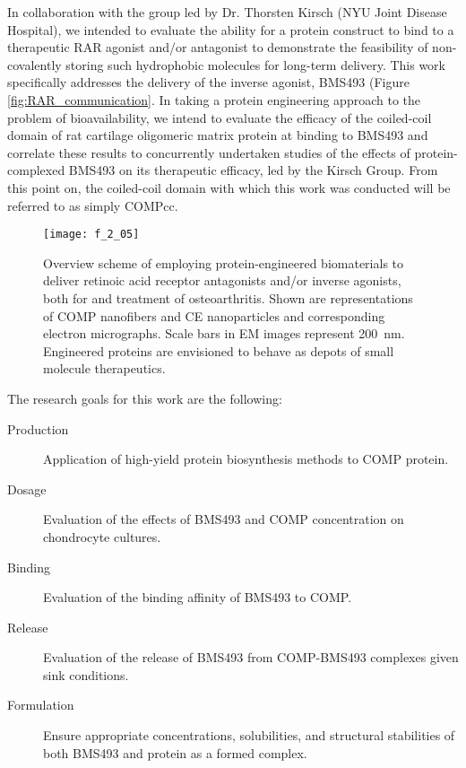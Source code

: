 \begin{refsection}
In collaboration with the group led by Dr. Thorsten Kirsch (NYU Joint Disease
Hospital), we intended to evaluate the ability for a protein construct to bind
to a therapeutic RAR agonist and/or antagonist to demonstrate the feasibility of
non-covalently storing such hydrophobic molecules for long-term delivery. This
work specifically addresses the delivery of the inverse agonist, BMS493 (Figure
\ref{fig:RAR_communication}. In taking a protein engineering approach to the
problem of bioavailability, we intend to evaluate the efficacy of the
coiled-coil domain of rat cartilage oligomeric matrix protein at binding to
BMS493 and correlate these results to concurrently undertaken 
studies of the effects of protein-complexed BMS493 on its therapeutic efficacy,
led by the Kirsch Group. From this point on, the coiled-coil domain with which
this work was conducted will be referred to as simply COMPcc.
\begin{figure}[h!] \centering \texttt{[image: f\_2\_05]}
    \caption{Overview scheme of employing protein-engineered biomaterials to
        deliver retinoic acid receptor antagonists and/or inverse agonists, both
        for  and  treatment of osteoarthritis.
        Shown are representations of COMP nanofibers and CE nanoparticles and
        corresponding electron micrographs. Scale bars in EM images represent
        \SI{200}{\nm}. Engineered proteins are envisioned to behave as depots of
    small molecule therapeutics.}\label{fig:research_intention} \end{figure}
The research goals for this work are the following:
\begin{description}
    \item[Production] Application of high-yield protein biosynthesis methods to
        COMP protein.
    \item[Dosage] Evaluation of the effects of BMS493 and COMP concentration on
         chondrocyte cultures.
    \item[Binding] Evaluation of the binding affinity of BMS493 to COMP.
    \item[Release] Evaluation of the release of BMS493 from COMP-BMS493
        complexes given sink conditions.
    \item[Formulation] Ensure appropriate concentrations, solubilities, and
        structural stabilities of both BMS493 and protein as a formed complex.

\end{description}
\end{refsection}
